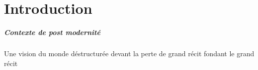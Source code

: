 \chapter{Introduction}


\paragraph{Contexte de post modernité}
\begin{Def}
Une vision du monde déstructurée devant la perte de grand récit fondant le grand récit
\end{Def}




